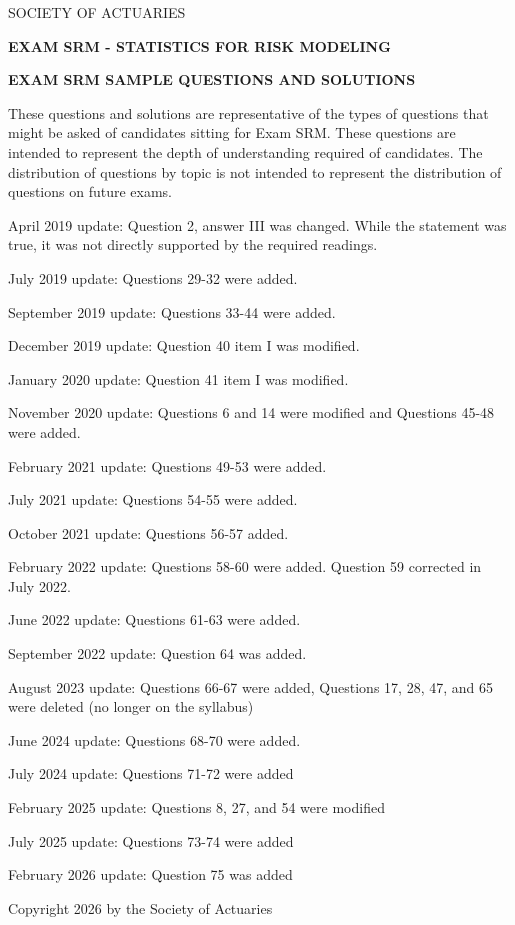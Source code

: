 \begin{center}
  {SOCIETY OF ACTUARIES\par}
  \vspace{1.2em}
  {\bfseries EXAM SRM - STATISTICS FOR RISK MODELING\par}
  \vspace{1.2em}
  {\bfseries EXAM SRM SAMPLE QUESTIONS AND SOLUTIONS\par}
\end{center}
\vspace{1em}

These questions and solutions are representative of the types of questions that might be asked of candidates sitting for Exam SRM. These questions are intended to represent the depth of understanding required of candidates. The distribution of questions by topic is not intended to represent the distribution of questions on future exams.

April 2019 update: Question 2, answer III was changed. While the statement was true, it was not directly supported by the required readings.

July 2019 update: Questions 29-32 were added.

September 2019 update: Questions 33-44 were added.

December 2019 update: Question 40 item I was modified.

January 2020 update: Question 41 item I was modified.

November 2020 update: Questions 6 and 14 were modified and Questions 45-48 were added.

February 2021 update: Questions 49-53 were added.

July 2021 update: Questions 54-55 were added.

October 2021 update: Questions 56-57 added.

February 2022 update: Questions 58-60 were added. Question 59 corrected in July 2022.

June 2022 update: Questions 61-63 were added.

September 2022 update: Question 64 was added.

August 2023 update: Questions 66-67 were added, Questions 17, 28, 47, and 65 were deleted (no longer on the syllabus)

June 2024 update: Questions 68-70 were added.

July 2024 update: Questions 71-72 were added

February 2025 update: Questions 8, 27, and 54 were modified

July 2025 update: Questions 73-74 were added

February 2026 update: Question 75 was added

Copyright 2026 by the Society of Actuaries